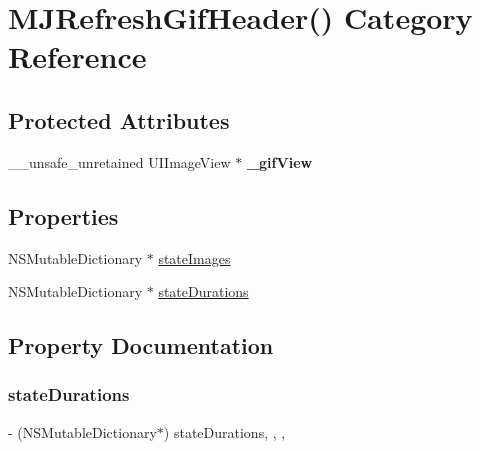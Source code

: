 \hypertarget{category_m_j_refresh_gif_header_07_08}{}\section{M\+J\+Refresh\+Gif\+Header() Category Reference}
\label{category_m_j_refresh_gif_header_07_08}
\subsection*{Protected Attributes}
\begin{DoxyCompactItemize}
\item 
\mbox{\label{category_m_j_refresh_gif_header_07_08_a6e2de3c28b4543ca209a76b7f202530f}} 
\+\_\+\+\_\+unsafe\+\_\+unretained U\+I\+Image\+View $\ast$ {\bfseries \+\_\+gif\+View}
\end{DoxyCompactItemize}
\subsection*{Properties}
\begin{DoxyCompactItemize}
\item 
N\+S\+Mutable\+Dictionary $\ast$ \mbox{\hyperlink{category_m_j_refresh_gif_header_07_08_a0e1525cef10052616245900e4f0826b3}{state\+Images}}
\item 
N\+S\+Mutable\+Dictionary $\ast$ \mbox{\hyperlink{category_m_j_refresh_gif_header_07_08_a6fc5506f37812bc8d62c54c6982b62f4}{state\+Durations}}
\end{DoxyCompactItemize}


\subsection{Property Documentation}
\mbox{\label{category_m_j_refresh_gif_header_07_08_a6fc5506f37812bc8d62c54c6982b62f4}} 
\subsubsection{\texorpdfstring{state\+Durations}{stateDurations}}
{\footnotesize\ttfamily -\/ (N\+S\+Mutable\+Dictionary$\ast$) state\+Durations\hspace{0.3cm}{\ttfamily [read]}, {\ttfamily [write]}, {\ttfamily [nonatomic]}, {\ttfamily [strong]}}

